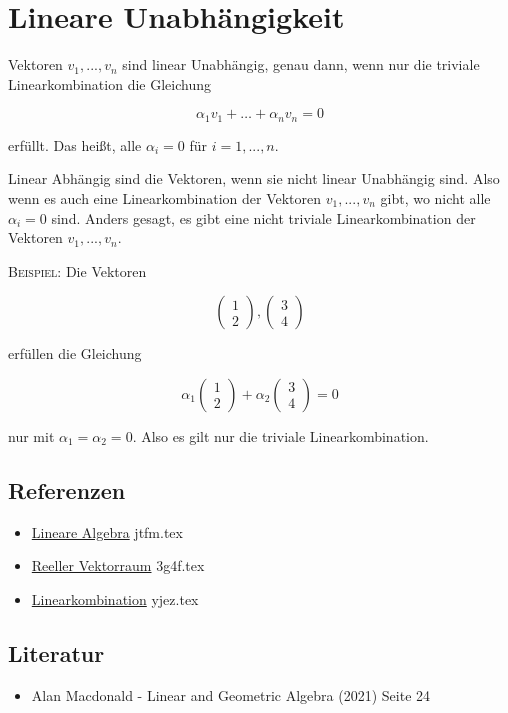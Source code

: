 \documentclass{sajzk}
\begin{document}
\section{Lineare Unabhängigkeit}
\label{v332}
Vektoren $v_1, ..., v_n$ sind linear Unabhängig, genau dann, wenn nur die
triviale Linearkombination die Gleichung

\[
\alpha_1 v_1 + \dots + \alpha_n v_n = 0
\]

erfüllt. Das heißt, alle $\alpha_i = 0$ für $i = 1, ..., n$.

Linear Abhängig sind die Vektoren, wenn sie nicht linear Unabhängig sind. Also
wenn es auch eine Linearkombination der Vektoren $v_1, ..., v_n$ gibt, wo nicht
alle $\alpha_i = 0$ sind. Anders gesagt, es gibt eine nicht triviale
Linearkombination der Vektoren $v_1, ..., v_n$.

\textsc{Beispiel:} Die Vektoren

\[
\begin{pmatrix}
 1 \\
 2
\end{pmatrix} ,
\begin{pmatrix}
 3 \\
 4
\end{pmatrix}
\]

erfüllen die Gleichung

\[
\alpha_1
\begin{pmatrix}
 1 \\
 2
\end{pmatrix}
+
\alpha_2
\begin{pmatrix}
 3 \\
 4
\end{pmatrix} = 0
\]

nur mit $\alpha_1 = \alpha_2 = 0$. Also es gilt nur die triviale Linearkombination.

\subsection{Referenzen}
\begin{itemize}
    \item \href{jtfm.pdf}{Lineare Algebra} jtfm.tex
    \item \href{3g4f.pdf}{Reeller Vektorraum} 3g4f.tex
    \item \href{yjez.pdf}{Linearkombination} yjez.tex
\end{itemize}

\subsection{Literatur}
\begin{itemize}
    \item Alan Macdonald - Linear and Geometric Algebra (2021) Seite 24
\end{itemize}
\end{document}
